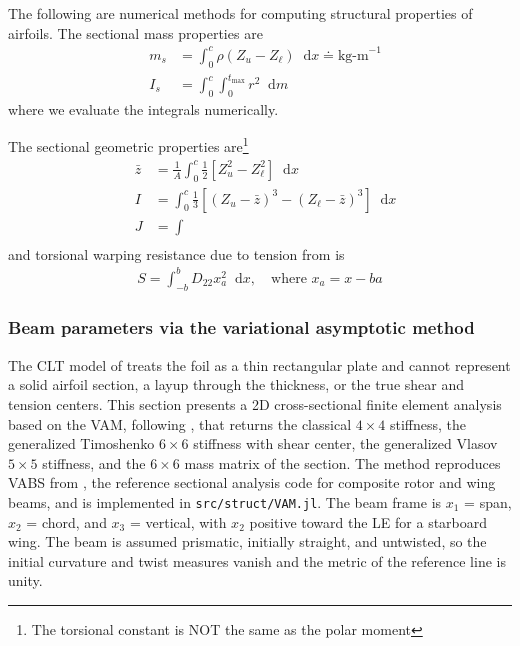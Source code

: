 \documentclass[10pt]{article}
\newcommand{\diff}{\mathop{}\!\tn{d}} %
\newcommand{\be}{\begin{eqnarray}}
\newcommand{\ee}{\end{eqnarray}}
\newcommand{\tn}[1]{\textrm{#1}}
\begin{document}
The following are numerical methods for computing structural properties of airfoils.
The sectional mass properties are
\be
& m_s & = \int_{0}^{c} \rho \left(Z_u - Z_\ell \right)  \diff x \doteq \tn{kg-m}^{-1}
\\
& I_s & = \int_{0}^{c}\int_{0}^{t_{\tn{max}}} r^2 \diff m
\ee
where we evaluate the integrals numerically.

The sectional geometric properties are\footnote{The torsional constant is NOT the same as the polar moment}
\be
& \bar{z} & =\frac{1}{A} \int_0^c \frac{1}{2}\left[Z_u^2-Z_{\ell}^2\right] \diff x \\
& I & =\int_0^c \frac{1}{3}\left[\left(Z_u-\bar{z}\right)^3-\left(Z_{\ell}-\bar{z}\right)^3\right] \diff x \\
& J &= \int \\
\ee
and torsional warping resistance due to tension from \citet{LOTTATI1985} is
\be
S = \int_{-b}^b D_{22} x_a^2 \diff x, \quad\tn{where } x_a = x - ba
\ee
\subsubsection{Beam parameters via the variational asymptotic method}
%
The \ac{CLT} model of \citet{Weisshaar1985} treats the foil as a thin rectangular plate and cannot represent a solid airfoil section, a layup through the thickness, or the true shear and tension centers.
This section presents a 2D cross-sectional finite element analysis based on the \ac{VAM}, following \citet{Hodges2006}, that returns the classical $4\times4$ stiffness, the generalized Timoshenko $6\times6$ stiffness with shear center, the generalized Vlasov $5\times5$ stiffness, and the $6\times6$ mass matrix of the section.
The method reproduces \ac{VABS} from \citet{Cesnik1997}, the reference sectional analysis code for composite rotor and wing beams, and is implemented in \texttt{src/struct/VAM.jl}.
The beam frame is $x_1$ = span, $x_2$ = chord, and $x_3$ = vertical, with $x_2$ positive toward the \ac{LE} for a starboard wing.
The beam is assumed prismatic, initially straight, and untwisted, so the initial curvature and twist measures vanish and the metric of the reference line is unity.
\end{document}
